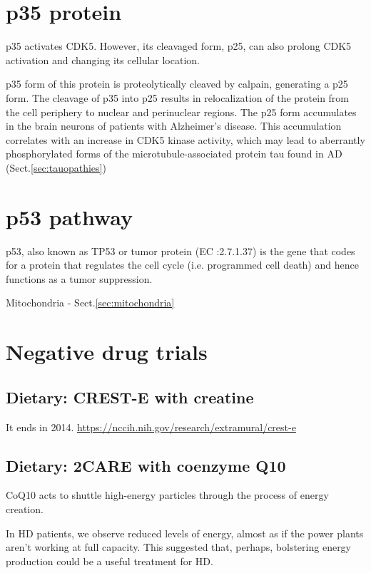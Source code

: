 \section{p35 protein}
\label{sec:p35-protein}

p35 activates CDK5. However, its cleavaged form, p25, can also prolong CDK5
activation and changing its cellular location.

p35 form of this protein is proteolytically cleaved by calpain, generating a p25
form. The cleavage of p35 into p25 results in relocalization of the protein from
the cell periphery to nuclear and perinuclear regions.
The p25 form accumulates in the brain neurons of patients with Alzheimer's
disease. This accumulation correlates with an increase in CDK5 kinase activity,
which may lead to aberrantly phosphorylated forms of the
microtubule-associated protein tau found in AD (Sect.\ref{sec:tauopathies})

\section{p53 pathway}
\label{sec:p53-pathway}

p53, also known as TP53 or tumor protein (EC :2.7.1.37) is the gene that codes
for a protein that regulates the cell cycle (i.e. programmed cell death) and
hence functions as a tumor suppression.

Mitochondria - Sect.\ref{sec:mitochondria}

\section{Negative drug trials}

\subsection{Dietary: CREST-E with creatine}

It ends in 2014.
\url{https://nccih.nih.gov/research/extramural/crest-e}

\subsection{Dietary: 2CARE with coenzyme Q10}

CoQ10 acts to shuttle high-energy particles through the process of energy
creation.

In HD patients, we observe reduced levels of energy, almost as if the power
plants aren't working at full capacity. This suggested that, perhaps, bolstering
energy production could be a useful treatment for HD.

